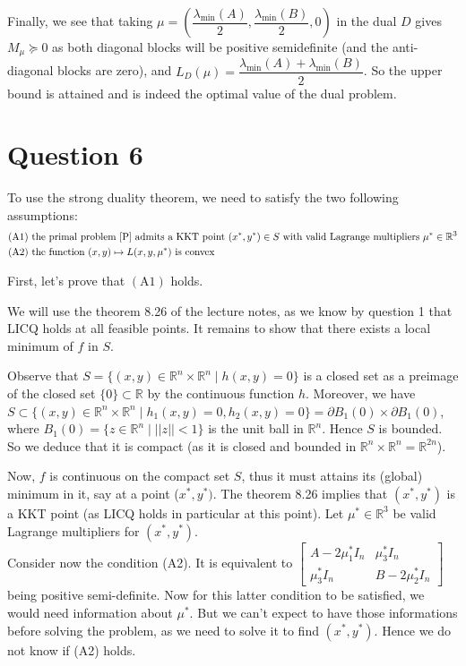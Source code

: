 \documentclass{article}
\newcommand{\R}{\mathbb{R}}
\begin{document}
Finally, we see that taking $\mu=\left(\dfrac{\lambda_{\min} (A)}{2}, \dfrac{\lambda_{\min} (B)}{2}, 0\right)$ in the dual $D$ gives $M_{\mu}\succeq 0$ as both diagonal blocks will be positive semidefinite (and the anti-diagonal blocks are zero), and $L_D(\mu)=\dfrac{\lambda_{\min} (A)+\lambda_{\min} (B)}{2}$. So the upper bound is attained and is indeed the optimal value of the dual problem.


\section*{Question 6}
To use the strong duality theorem, we need to satisfy the two following assumptions:
\begin{align*}
(\text{A}1) &  \text{ the primal problem \eqref{P} admits a KKT point } (x^*,y^*)\in S \text{ with valid Lagrange multipliers } \mu^*\in \R^3 \\
(\text{A}2) &  \text{ the function } (x,y)\mapsto L(x,y,\mu^*) \text{ is convex}
\end{align*}

\noindent First, let's prove that $(\text{A}1)$ holds.

We will use the theorem 8.26 of the lecture notes, as we know by question 1 that LICQ holds at all feasible points. It remains to show that there exists a local minimum of $f$ in $S$.
 
Observe that $S=\{(x,y)\in\R^n\times\R^n \mid h(x,y)=0\}$ is a closed set as a preimage of the closed set $\{0\}\subset \R$ by the continuous function $h$. Moreover, we have $S\subset \{(x, y)\in\R^n\times\R^n \mid h_1(x,y)=0, h_2(x,y)=0\} = \partial B_1(0)\times \partial B_1(0)$, where $B_1(0)=\{z\in\R^n\mid ||z||<1\}$ is the unit ball in $\R^n$. Hence $S$ is bounded. So we deduce that it is compact (as it is closed and bounded in $\R^n\times\R^n=\R^{2n}$).
 
 Now, $f$ is continuous on the compact set $S$, thus it must attains its (global) minimum in it, say at a point ($x^*,y^*)$. The theorem 8.26 implies that $(x^*,y^*)$ is a KKT point (as LICQ holds in particular at this point).
 Let $\mu^*\in\R^3$ be valid Lagrange multipliers for $(x^*,y^*)$.\\
 
\noindent Consider now the condition (A2). It is equivalent to $\begin{bmatrix} A-2\mu^*_1 I_n & \mu^*_3 I_n \\
\mu^*_3 I_n & B-2\mu^*_2 I_n \end{bmatrix}$ being positive semi-definite. Now for this latter condition to be satisfied, we would need information about $\mu^*$. But we can't expect to have those informations before solving the problem, as we need to solve it to find $(x^*,y^*)$. Hence we do not know if (A2) holds.
 
\end{document}
